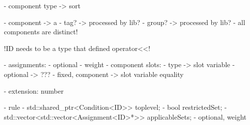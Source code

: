 - component type -> sort

- component -> a 
  - tag?	-> processed by lib?
  - group?	-> processed by lib?
- all components are distinct!

!ID needs to be a type that defined operator<<! 

- assignments:
	- optional
	- weight
	- component slots:
		- type			-> slot variable
		- optional		-> ???
		- fixed, component -> slot variable equality
		
- extension: number

- rule
	- std::shared_ptr<Condition<ID>> toplevel;
	- bool restrictedSet;
    - std::vector<std::vector<Assignment<ID>*>> applicableSets;
    - optional, weight